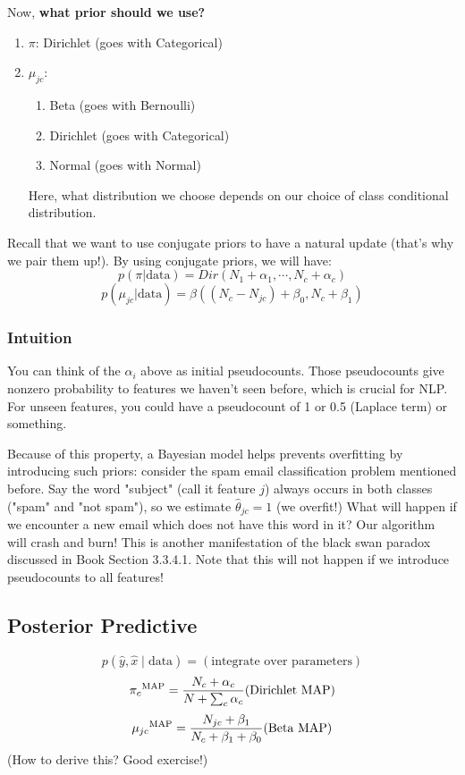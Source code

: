 \documentclass{article}
\begin{document}
Now, \textbf{what prior should we use?}
\begin{enumerate}
    \item $\pi$: Dirichlet (goes with Categorical)
    \item $\mu_{jc}$: 
        \begin{enumerate}
            \item Beta (goes with Bernoulli)
            \item Dirichlet (goes with Categorical)
            \item Normal (goes with Normal)
        \end{enumerate}
        Here, what distribution we choose depends on our choice of class conditional distribution.
\end{enumerate} 
Recall that we want to use conjugate priors to have a natural update (that's why we pair them up!). By using conjugate priors, we will have:
    \[ p(\pi | \text{data}) = Dir(N_1 + \alpha_1, \cdots, N_c + \alpha_c) \]
    \[ p(\mu_{jc} | \text{data}) = \beta((N_c - N_{jc}) + \beta_0, N_c + \beta_1) \]
\subsubsection{Intuition}
You can think of the $\alpha_i$ above as initial pseudocounts. Those pseudocounts give nonzero probability to features we haven't seen before, which is crucial for NLP. For unseen features, you could have a pseudocount of 1 or 0.5 (Laplace term) or something. 

Because of this property, a Bayesian model helps prevents overfitting by introducing such priors: consider the spam email classification problem mentioned before. Say the word "subject" (call it feature $j$) always occurs in both classes ("spam" and "not spam"), so we estimate $\hat{\theta}_{jc} = 1$ (we overfit!) What will happen if we encounter a new email which does not have this word in it? Our algorithm will crash and burn! This is another manifestation of the black swan paradox discussed in Book Section 3.3.4.1. Note that this will not happen if we introduce pseudocounts to all features! 
\subsection{Posterior Predictive}
\[p(\hat{y}, \hat{x} \mid \text{data}) = (\text{integrate over parameters})\] 
\[ {\pi_c}^{\operatorname{MAP}} = \frac{N_c + \alpha_c}{N + \sum_c \alpha_c} (\text{Dirichlet MAP}) \] 
\[{\mu_{jc}}^{\operatorname{MAP}} = \frac{N_{jc} + \beta_1}{N_c + \beta_1 + \beta_0} (\text{Beta MAP})\] 
(How to derive this? Good exercise!)
\end{document}

